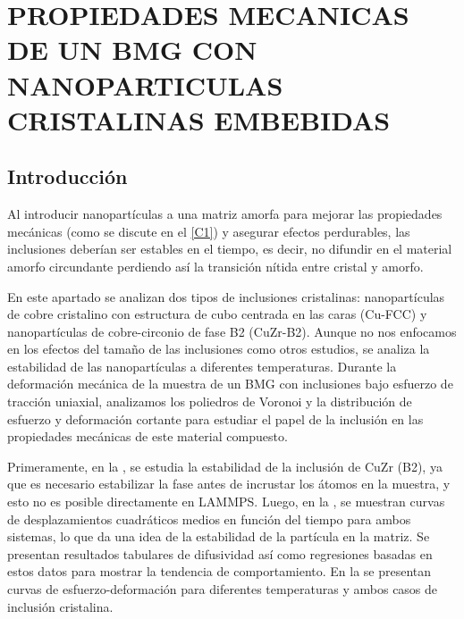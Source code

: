 
\chapter{PROPIEDADES MECANICAS DE UN BMG CON NANOPARTICULAS CRISTALINAS EMBEBIDAS} %

\label{C4} %


\section{Introducción}
Al introducir nanopartículas a una matriz amorfa para mejorar las propiedades mecánicas (como se discute en el \cref{C1}) y asegurar efectos perdurables, las inclusiones deberían ser estables en el tiempo, es decir, no difundir en el material amorfo circundante perdiendo así la transición nítida entre cristal y amorfo.

En este apartado se analizan dos tipos de inclusiones cristalinas: nanopartículas de cobre cristalino con estructura de cubo centrada en las caras (Cu-FCC) y nanopartículas de cobre-circonio de fase B2 (CuZr-B2). Aunque no nos enfocamos en los efectos del tamaño de las inclusiones como otros estudios, se analiza la estabilidad de las nanopartículas a diferentes temperaturas. Durante la deformación mecánica de la muestra de un BMG con inclusiones bajo esfuerzo de tracción uniaxial, analizamos los poliedros de Voronoi y la distribución de esfuerzo y deformación cortante para estudiar el papel de la inclusión en las propiedades mecánicas de este material compuesto.

Primeramente, en la , se estudia la estabilidad de la inclusión de CuZr (B2), ya que es necesario estabilizar la fase antes de incrustar los átomos en la muestra, y esto no es posible directamente en LAMMPS. Luego, en la , se muestran curvas de desplazamientos cuadráticos medios en función del tiempo para ambos sistemas, lo que da una idea de la estabilidad de la partícula en la matriz. Se presentan resultados tabulares de difusividad así como regresiones basadas en estos datos para mostrar la tendencia de comportamiento. En la  se presentan curvas de esfuerzo-deformación para diferentes temperaturas y ambos casos de inclusión cristalina.

